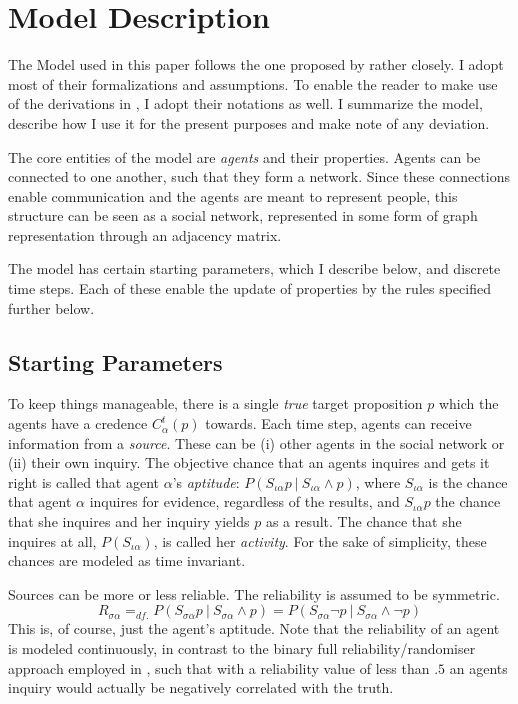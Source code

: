 \documentclass[11pt, a4paper]{scrartcl}
\newcommand{\Ssa}{S_{\sigma\alpha}}
\newcommand{\given}[1][]{\:#1\vert\:}
\renewcommand{\i}[1]{\emph{#1}}
\begin{document}
\section{Model Description}

The Model used in this paper follows the one proposed by \textcite{Olsson2013} rather closely. I adopt most of their formalizations and assumptions. To enable the reader to make use of the derivations in \textcite{Angere2010}, I adopt their notations as well. I summarize the model, describe how I use it for the present purposes and make note of any deviation.

The core entities of the model are \i{agents} and their properties. Agents can be connected to one another, such that they form a network. Since these connections enable communication and the agents are meant to represent people, this structure can be seen as a social network, represented in some form of graph representation through an adjacency matrix.

The model has certain starting parameters, which I describe below, and discrete time steps. Each of these enable the update of properties by the rules specified further below.

\subsection{Starting Parameters}

To keep things manageable, there is a single \i{true} target proposition $p$ which the agents have a credence $C^t_\alpha(p)$ towards. Each time step, agents can receive information from a \i{source}. These can be (i) other agents in the social network or (ii) their own inquiry. The objective chance that an agents inquires and gets it right is called that agent $\alpha$'s \i{aptitude}: $P(S_{\iota \alpha}p \given S_{\iota \alpha} \land p)$, where $S_{\iota \alpha}$ is the chance that agent $\alpha$ inquires for evidence, regardless of the results, and $S_{\iota \alpha} p$ the chance that she inquires and her inquiry yields $p$ as a result. The chance that she inquires at all, $P(S_{\iota \alpha})$, is called her \i{activity}. For the sake of simplicity, these chances are modeled as time invariant.

Sources can be more or less reliable. The reliability is assumed to be symmetric.
\[ 
R_{\sigma \alpha} =_{df.} P(\Ssa p \given \Ssa \land p) = P(\Ssa \neg p \given \Ssa \land \neg p)
\]
This is, of course, just the agent's aptitude. Note that the reliability of an agent is modeled continuously, in contrast to the binary full reliability/randomiser approach employed in \textcite[Chp. 3]{Bovens2003}, such that with a reliability value of less than $.5$ an agents inquiry would actually be negatively correlated with the truth.
\end{document}
